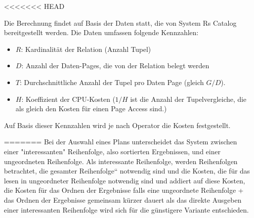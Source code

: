 <<<<<<< HEAD


Die Berechnung findet auf Basis der Daten statt, die von System Rs Catalog bereitgestellt werden. Die Daten umfassen folgende Kennzahlen:

\begin{itemize}
\item $R$: Kardinalität der Relation (Anzahl Tupel)
\item $D$: Anzahl der Daten-Pages, die von der Relation belegt werden
\item $T$: Durchschnittliche Anzahl der Tupel pro Daten Page (gleich $G/D$).
\item $H$: Koeffizient der CPU-Kosten ($1/H$ ist die Anzahl der Tupelvergleiche, die  als gleich den Kosten für einen Page Access sind.)
\end{itemize}

Auf Basis dieser Kennzahlen wird je nach Operator die Kosten festgestellt. 



=======
Bei der Auswahl eines Plans unterscheidet das System zwischen einer "interessanten" Reihenfolge, also sortierten Ergebnissen, und einer ungeordneten Reihenfolge. Als interessante Reihenfolge, werden Reihenfolgen betrachtet, die gesamter Reihenfolge“ notwendig sind und die Kosten, die für das lesen in ungeordneter Reihenfolge notwendig sind und addiert auf diese Kosten, die Kosten für das Ordnen der Ergebnisse falls eine ungeordnete Reihenfolge + das Ordnen der Ergebnisse gemeinsam kürzer dauert als das direkte Ausgeben einer interessanten Reihenfolge wird sich für die günstigere Variante entschieden. 

